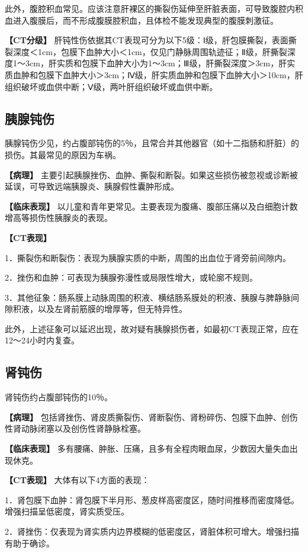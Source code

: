 此外，腹腔积血常见。应该注意肝裸区的撕裂伤延伸至肝脏表面，可导致腹腔内积血进入腹膜后，而不形成腹膜腔积血，且体检不能发现典型的腹膜刺激征。

\textbf{【CT分级】}
肝钝性伤依据其CT表现可分为以下5级：Ⅰ级，肝包膜撕裂，表面撕裂深度＜1cm，包膜下血肿大小＜1cm，仅见门静脉周围轨迹征；Ⅱ级，肝撕裂深度1～3cm，肝实质和包膜下血肿大小为1～3cm；Ⅲ级，肝撕裂深度＞3cm，肝实质血肿和包膜下血肿大小＞3cm；Ⅳ级，肝实质血肿和包膜下血肿大小＞10cm，肝组织破坏或血供中断；Ⅴ级，两叶肝组织破坏或血供中断。

\subsection{胰腺钝伤}

胰腺钝伤少见，约占腹部钝伤的5％，且常合并其他器官（如十二指肠和肝脏）的损伤。其最常见的原因为车祸。

\textbf{【病理】}
主要引起胰腺挫伤、血肿、撕裂和断裂。如果这些损伤被忽视或诊断被延误，可导致远端胰腺炎、胰腺假性囊肿形成。

\textbf{【临床表现】}
以儿童和青年更常见。主要表现为腹痛、腹部压痛以及白细胞计数增高等损伤性胰腺炎的表现。

\textbf{【CT表现】}

1．撕裂伤和断裂伤：表现为胰腺实质的中断，周围的出血位于肾旁前间隙内。

2．挫伤和血肿：可表现为胰腺弥漫性或局限性增大，或轮廓不规则。

3．其他征象：肠系膜上动脉周围的积液、横结肠系膜处的积液、胰腺与脾静脉间隙积液，以及左肾前筋膜的增厚等，但无特异性。

此外，上述征象可以延迟出现，故对疑有胰腺损伤者，如最初CT表现正常，应在12～24小时内复查。

\subsection{肾钝伤}

肾钝伤约占腹部钝伤的10％。

\textbf{【病理】}
包括肾挫伤、肾皮质撕裂伤、肾断裂伤、肾粉碎伤、包膜下血肿、创伤性肾动脉闭塞以及创伤性肾静脉栓塞。

\textbf{【临床表现】}
多有腰痛、肿胀、压痛，且多有全程肉眼血尿，少数因大量失血出现休克。

\textbf{【CT表现】} 大体有以下4方面的表现：

1．肾包膜下血肿：肾包膜下半月形、葱皮样高密度区，随时间推移而密度降低。增强扫描呈低密度，肾实质受压。

2．肾挫伤：仅表现为肾实质内边界模糊的低密度区，肾脏体积可增大。增强扫描有助于确诊。

